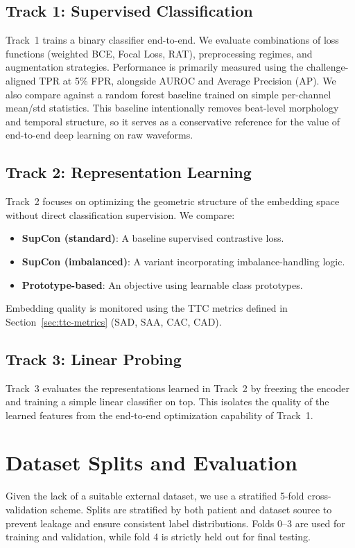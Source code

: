 \subsection{Track 1: Supervised Classification}
Track~1 trains a binary classifier end-to-end. We evaluate combinations of loss functions (weighted BCE, Focal Loss, RAT), preprocessing regimes, and augmentation strategies.
Performance is primarily measured using the challenge-aligned TPR at 5\% FPR, alongside AUROC and Average Precision (AP).
We also compare against a random forest baseline trained on simple per-channel mean/std statistics.
This baseline intentionally removes beat-level morphology and temporal structure, so it serves as a conservative reference for the value of end-to-end deep learning on raw waveforms.

\subsection{Track 2: Representation Learning}
Track~2 focuses on optimizing the geometric structure of the embedding space without direct classification supervision. We compare:
\begin{itemize}
  \item \textbf{SupCon (standard)}: A baseline supervised contrastive loss.
  \item \textbf{SupCon (imbalanced)}: A variant incorporating imbalance-handling logic.
  \item \textbf{Prototype-based}: An objective using learnable class prototypes.
\end{itemize}
Embedding quality is monitored using the TTC metrics defined in Section~\ref{sec:ttc-metrics} (SAD, SAA, CAC, CAD).

\subsection{Track 3: Linear Probing}
Track~3 evaluates the representations learned in Track~2 by freezing the encoder and training a simple linear classifier on top. This isolates the quality of the learned features from the end-to-end optimization capability of Track~1.

\section{Dataset Splits and Evaluation}
Given the lack of a suitable external dataset, we use a stratified 5-fold cross-validation scheme.
Splits are stratified by both patient and dataset source to prevent leakage and ensure consistent label distributions.
Folds 0--3 are used for training and validation, while fold 4 is strictly held out for final testing.

